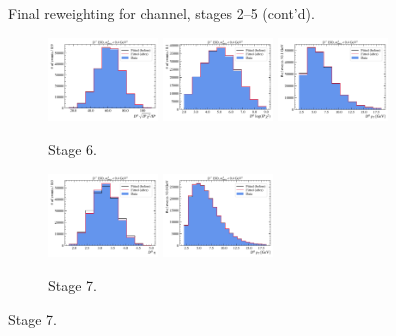 \begin{figure}[htb]
    \caption[]{Final reweighting for \Dstar channel, stages 2--5 (cont'd).}
    \label{fig:final-rwt-dst-idx1}
\end{figure}

\begin{figure}[htb]
    \begin{subfigure}{\textwidth}
        \centering
        \includegraphics[width=0.32\textwidth]{./figs-mc-correction/reweighting-final/plot_step5-Dst_iso-d0_comp.pdf}
        \includegraphics[width=0.32\textwidth]{./figs-mc-correction/reweighting-final/plot_step5-Dst_iso-d0_log_ip_chi2.pdf}
        \includegraphics[width=0.32\textwidth]{./figs-mc-correction/reweighting-final/plot_step5-Dst_iso-d0_pt.pdf}
        \caption{Stage 6.}
    \end{subfigure}

    \begin{subfigure}{\textwidth}
        \centering
        \includegraphics[width=0.32\textwidth]{./figs-mc-correction/reweighting-final/plot_step6-Dst_iso-d0_eta.pdf}
        \includegraphics[width=0.32\textwidth]{./figs-mc-correction/reweighting-final/plot_step6-Dst_iso-d0_pt.pdf}
        \caption{Stage 7.}
    \end{subfigure}


\end{figure}
